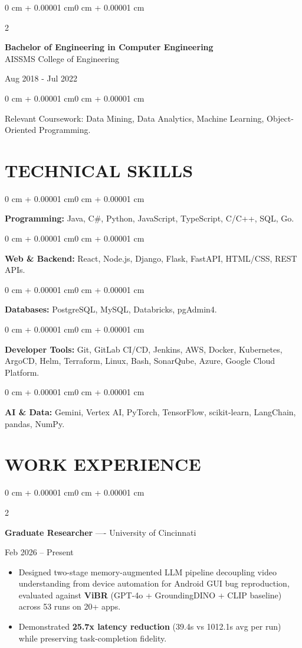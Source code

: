 \documentclass[10pt, letterpaper]{article}
\newenvironment{highlights}{
    \begin{itemize}[
        topsep=0.10 cm,
        parsep=0.06 cm,
        partopsep=0pt,
        itemsep=0.06 cm,
        leftmargin=12pt
    ]
}{
    \end{itemize}
}
\newenvironment{onecolentry}{
    \begin{adjustwidth}{0 cm + 0.00001 cm}{0 cm + 0.00001 cm}
}{
    \end{adjustwidth}
}
\newenvironment{twocolentry}[2][]{
    \onecolentry
    \def\secondColumn{#2}
    \setcolumnwidth{\fill, 4.5 cm}
    \begin{paracol}{2}
}{
    \switchcolumn \raggedleft \secondColumn
    \end{paracol}
    \endonecolentry
}
\begin{document}
\begin{twocolentry}{
    Aug 2018 - Jul 2022
}
    \textbf{Bachelor of Engineering in Computer Engineering} \\
    AISSMS College of Engineering
\end{twocolentry}
\begin{onecolentry}
Relevant Coursework: Data Mining, Data Analytics, Machine Learning, Object-Oriented Programming.
\end{onecolentry}
\section{TECHNICAL SKILLS}
\begin{onecolentry}
\textbf{Programming:} Java, C\#, Python, JavaScript, TypeScript, C/C++, SQL, Go.
\end{onecolentry}
\vspace{0.06 cm}
\begin{onecolentry}
\textbf{Web \& Backend:} React, Node.js, Django, Flask, FastAPI, HTML/CSS, REST APIs.
\end{onecolentry}
\vspace{0.06 cm}
\begin{onecolentry}
\textbf{Databases:} PostgreSQL, MySQL, Databricks, pgAdmin4.
\end{onecolentry}
\vspace{0.06 cm}
\begin{onecolentry}
\textbf{Developer Tools:} Git, GitLab CI/CD, Jenkins, AWS, Docker, Kubernetes, ArgoCD, Helm, Terraform, Linux, Bash, SonarQube, Azure, Google Cloud Platform.
\end{onecolentry}
\vspace{0.06 cm}
\begin{onecolentry}
\textbf{AI \& Data:} Gemini, Vertex AI, PyTorch, TensorFlow, scikit-learn, LangChain, pandas, NumPy.
\end{onecolentry}

\section{WORK EXPERIENCE}
\begin{twocolentry}{Feb 2026 -- Present}
\textbf{Graduate Researcher} ---- University of Cincinnati
\end{twocolentry}
\begin{highlights}
  \item Designed two-stage memory-augmented LLM pipeline decoupling video understanding from device automation for Android GUI bug reproduction, evaluated against \textbf{ViBR} (GPT-4o + GroundingDINO + CLIP baseline) across 53 runs on 20+ apps.
  \item Demonstrated \textbf{25.7x latency reduction} (39.4s vs 1012.1s avg per run) while preserving task-completion fidelity.
\end{highlights}
\end{document}
